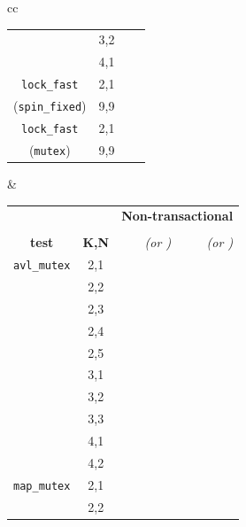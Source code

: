 \begin{table}[t]
\begin{center}
\begin{tabular}{cc}
\begin{tabular}{cc||r|r}
			& 3,2 & \ETAdag{26h 42m} & \ETAdag{1223955} \\
			& 4,1 & \cpu{665.89} & \ints{15064}	\\
			\hline
			{\tt lock\_fast}
			& 2,1 & \cpu{3.25} & \ints{1}	\\
			({\tt spin\_fixed})
			& 9,9 & \cpu{4.61} & \ints{1}	\\
			\hline
			{\tt lock\_fast}
			& 2,1 & \cpu{3.19} & \ints{1}	\\
			({\tt mutex})
			& 9,9 & \cpu{4.62} & \ints{1}	\\
			\end{tabular}
			&
			\begin{tabular}{cc||r|r}
			& & \multicolumn{2}{c}{\bf Non-transactional} \\
			& & \cpu{\bf cpu (s)} & \ints{\bf SS size} \\
			\bf test & \bf K,N & \em (or \ETAdag{\bf \em ETA}) & \em (or \ETAdag{\bf \em est.}) \\
			\hline
			\hline
			{\tt avl\_mutex}
			& 2,1 & \cpu{3.48} & \ints{7} \\
			& 2,2 & \cpu{6.25} & \ints{85} \\
			& 2,3 & \cpu{24.69} & \ints{561} \\
			& 2,4 & \cpu{217.98} & \ints{4984} \\
			& 2,5 & \cpu{3417.86} & \ints{76787} \\
			& 3,1 & \cpu{8.26} & \ints{129} \\
			& 3,2 & \cpu{1403.46} & \ints{30653} \\
			& 3,3 & \ETAdag{11d 22h} & \ETAdag{23136172} \\
			& 4,1 & \cpu{199.96} & \ints{4488} \\
			& 4,2 & \ETAdag{41d 0h} & \ETAdag{66520074} \\
			\cline{1-4}
			{\tt map\_mutex}
			& 2,1 & \cpu{39.81} & \ints{83} \\
			& 2,2 & \ETAdag{26h 21m} & \ETAdag{1085126} \\

\end{tabular}
\end{tabular}
\end{center}
\end{table}
